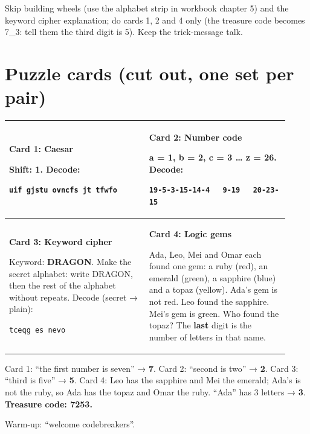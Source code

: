\begin{teachernote}
Skip building wheels (use the alphabet strip in workbook chapter 5) and the keyword cipher explanation; do cards 1, 2 and 4 only
(the treasure code becomes 7\_3: tell them the third digit is 5). Keep the trick-message talk.
\end{teachernote}

\clearpage
\section{Puzzle cards (cut out, one set per pair)}
\begin{center}
\renewcommand{\arraystretch}{1.4}
\begin{tabular}{|p{0.46\linewidth}|p{0.46\linewidth}|}
\hline
\textbf{Card 1: Caesar}\par
Shift: \textbf{1}. Decode:\par
\texttt{uif gjstu ovncfs jt tfwfo}\par\rule{0pt}{2.2cm}
&
\textbf{Card 2: Number code}\par
a = 1, b = 2, c = 3 \ldots{} z = 26. Decode:\par
\texttt{19-5-3-15-14-4 \ \ 9-19 \ \ 20-23-15}\par\rule{0pt}{2.2cm}
\\ \hline
\textbf{Card 3: Keyword cipher}\par
Keyword: \textbf{DRAGON}. Make the secret alphabet: write DRAGON, then the rest of the alphabet without repeats.
Decode (secret → plain):\par
\texttt{tceqg es nevo}\par\rule{0pt}{1.8cm}
&
\textbf{Card 4: Logic gems}\par
Ada, Leo, Mei and Omar each found one gem: a ruby (red), an emerald (green), a sapphire (blue) and a topaz (yellow).
Ada's gem is not red. Leo found the sapphire. Mei's gem is green.
Who found the topaz? The \textbf{last} digit is the number of letters in that name.\par\rule{0pt}{0.6cm}
\\ \hline
\end{tabular}
\end{center}

\begin{answer}
Card 1: \enquote{the first number is seven} → \textbf{7}.\quad
Card 2: \enquote{second is two} → \textbf{2}.\quad
Card 3: \enquote{third is five} → \textbf{5}.\quad
Card 4: Leo has the sapphire and Mei the emerald; Ada's is not the ruby, so Ada has the topaz and Omar the ruby. \enquote{Ada} has 3 letters → \textbf{3}.
\textbf{Treasure code: 7253.}\par
Warm-up: \enquote{welcome codebreakers}.
\end{answer}
